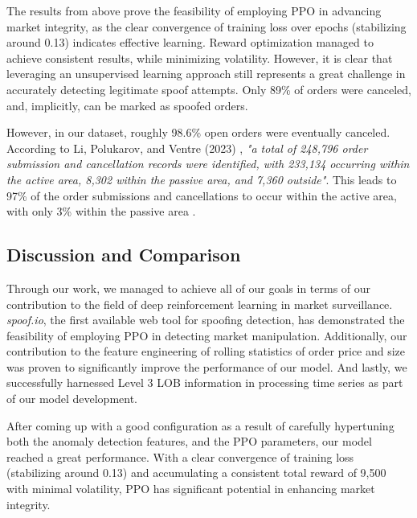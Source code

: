 \documentclass[conference]{IEEEtran}
\begin{document}
\par The results from above prove the feasibility of employing PPO in advancing market integrity, as the clear convergence of training loss over epochs (stabilizing around 0.13) indicates effective learning. Reward optimization managed to achieve consistent results, while minimizing volatility. However, it is clear that leveraging an unsupervised learning approach still represents a great challenge in accurately detecting legitimate spoof attempts. Only 89\% of orders were canceled, and, implicitly, can be marked as spoofed orders.

\par However, in our dataset, roughly 98.6\% open orders were eventually canceled. According to Li, Polukarov, and Ventre (2023) \cite{Li_2023}, \textit{"a total of 248,796 order submission and cancellation records were identified, with 233,134 occurring within the active area, 8,302 within the passive area, and 7,360 outside"}. This leads to 97\% of the order submissions and cancellations to occur within the active area, with only 3\% within the passive area \cite{Li_2023}.

\subsection{Discussion and Comparison}
\par Through our work, we managed to achieve all of our goals in terms of our contribution to the field of deep reinforcement learning in market surveillance. \textit{spoof.io}, the first available web tool for spoofing detection, has demonstrated the feasibility of employing PPO in detecting market manipulation. Additionally, our contribution to the feature engineering of rolling statistics of order price and size was proven to significantly improve the performance of our model. And lastly, we successfully harnessed Level 3 LOB information in processing time series as part of our model development.

\par After coming up with a good configuration as a result of carefully hypertuning both the anomaly detection features, and the PPO parameters, our model reached a great performance. With a clear convergence of training loss (stabilizing around 0.13) and accumulating a consistent total reward of 9,500 with minimal volatility, PPO has significant potential in enhancing market integrity.
\end{document}
